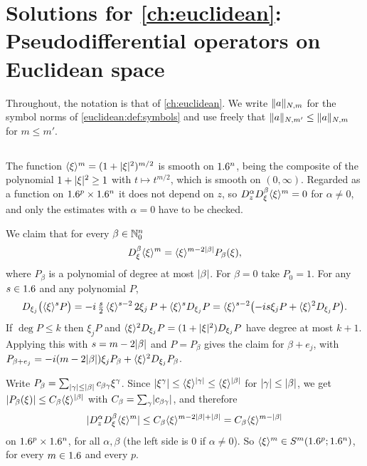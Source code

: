 \providecommand{\Amp}[2]{\mathcal{A}^{#1}_{#2}}%

\section{Solutions for \cref{ch:euclidean}: Pseudodifferential operators on Euclidean space}\label{solutions:euclidean}

Throughout, the notation is that of \cref{ch:euclidean}. We write
$\lVert a\rVert_{N,m}$ for the symbol norms of \cref{euclidean:def:symbols} and use freely
that $\lVert a\rVert_{N,m'}\le\lVert a\rVert_{N,m}$ for $m\le m'$.

\subsection*{}

The function $\langle \xi\rangle^m=(1+\lvert \xi\rvert^2)^{m/2}$ is smooth on $1.6^n$, being the composite of
the polynomial $1+\lvert \xi\rvert^2\ge1$ with $t\mapsto t^{m/2}$, which is smooth on
$(0,\infty)$. Regarded as a function on $1.6^p\times1.6^n$ it does not depend on $z$, so
$D^\alpha_zD^\beta_\xi\langle \xi\rangle^m=0$ for $\alpha\ne0$, and only the estimates with
$\alpha=0$ have to be checked.

We claim that for every $\beta\in\mathbb{N}_0^n$
\begin{equation*}
  D^\beta_\xi\langle \xi\rangle^m=\langle \xi\rangle^{m-2\lvert \beta\rvert}P_\beta(\xi),
\end{equation*}
where $P_\beta$ is a polynomial of degree at most $\lvert \beta\rvert$. For $\beta=0$ take
$P_0=1$. For any $s\in1.6$ and any polynomial $P$,
\begin{equation*}
  D_{\xi_j}\bigl(\langle \xi\rangle^sP\bigr)
  =-i\,\tfrac s2\,\langle \xi\rangle^{s-2}\,2\xi_j\,P+\langle \xi\rangle^sD_{\xi_j}P
  =\langle \xi\rangle^{s-2}\bigl(-is\xi_jP+\langle \xi\rangle^2D_{\xi_j}P\bigr).
\end{equation*}
If $\deg P\le k$ then $\xi_jP$ and $\langle \xi\rangle^2D_{\xi_j}P=(1+\lvert \xi\rvert^2)D_{\xi_j}P$ have
degree at most $k+1$. Applying this with $s=m-2\lvert \beta\rvert$ and $P=P_\beta$ gives the claim
for $\beta+e_j$, with
$P_{\beta+e_j}=-i(m-2\lvert \beta\rvert)\xi_jP_\beta+\langle \xi\rangle^2D_{\xi_j}P_\beta$.

Write $P_\beta=\sum_{\lvert \gamma\rvert\le\lvert \beta\rvert}c_{\beta\gamma}\xi^\gamma$. Since
$\lvert \xi^\gamma\rvert\le\langle \xi\rangle^{\lvert \gamma\rvert}\le\langle \xi\rangle^{\lvert \beta\rvert}$ for
$\lvert \gamma\rvert\le\lvert \beta\rvert$, we get $\lvert P_\beta(\xi)\rvert\le C_\beta\langle \xi\rangle^{\lvert \beta\rvert}$ with
$C_\beta=\sum_\gamma\lvert c_{\beta\gamma}\rvert$, and therefore
\begin{equation*}
  \lvert D^\alpha_zD^\beta_\xi\langle \xi\rangle^m\rvert\le C_\beta\langle \xi\rangle^{m-2\lvert \beta\rvert+\lvert \beta\rvert}
  =C_\beta\langle \xi\rangle^{m-\lvert \beta\rvert}
\end{equation*}
on $1.6^p\times1.6^n$, for all $\alpha,\beta$ (the left side is $0$ if $\alpha\ne0$). So
$\langle \xi\rangle^m\in S^m(1.6^p;1.6^n)$, for every $m\in1.6$ and every $p$.

